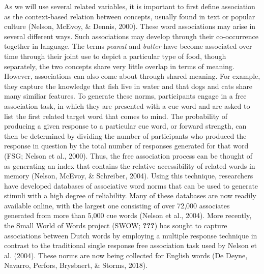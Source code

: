 \documentclass[english,,man]{apa6}
\begin{document}
As we will use several related variables, it is important to first
define association as the context-based relation between concepts,
usually found in text or popular culture (Nelson, McEvoy, \& Dennis,
2000). These word associations may arise in several different ways. Such
associations may develop through their co-occurrence together in
language. The terms \emph{peanut} and \emph{butter} have become
associated over time through their joint use to depict a particular type
of food, though separately, the two concepts share very little overlap
in terms of meaning. However, associations can also come about through
shared meaning. For example, they capture the knowledge that fish live
in water and that dogs and cats share many similiar features. To
generate these norms, participants engage in a free association task, in
which they are presented with a cue word and are asked to list the first
related target word that comes to mind. The probability of producing a
given response to a particular cue word, or forward strength, can then
be determined by dividing the number of participants who produced the
response in question by the total number of responses generated for that
word (FSG; Nelson et al., 2000). Thus, the free association process can
be thought of as generating an index that contains the relative
accessibility of related words in memory (Nelson, McEvoy, \& Schreiber,
2004). Using this technique, researchers have developed databases of
associative word norms that can be used to generate stimuli with a high
degree of reliability. Many of these databases are now readily available
online, with the largest one consisting of over 72,000 associates
generated from more than 5,000 cue words (Nelson et al., 2004). More
recently, the Small World of Words project (SWOW; {\textbf{???}}) has
sought to capture associations between Dutch words by employing a
multiple response technique in contrast to the traditional single
response free association task used by Nelson et al. (2004). These norms
are now being collected for English words (De Deyne, Navarro, Perfors,
Brysbaert, \& Storms, 2018).
\end{document}
